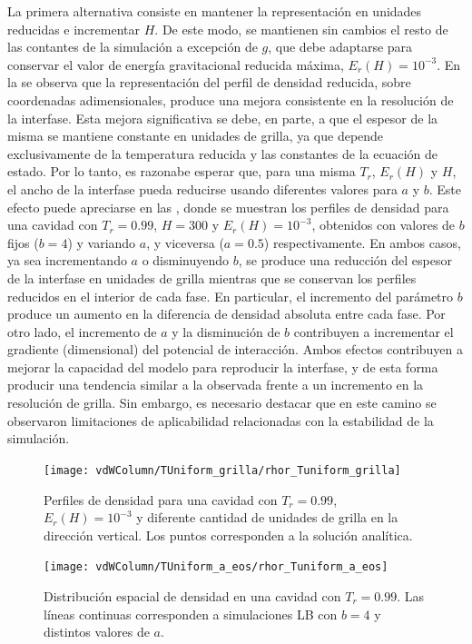 La primera alternativa consiste en mantener la representaci\'on en unidades reducidas e incrementar $H$. De este modo, se mantienen sin cambios el resto de las contantes de la simulaci\'on a excepci\'on de $g$, que debe adaptarse para conservar el valor de energ\'ia gravitacional reducida m\'axima, $E_r(H) = 10^{-3}$. En la  se observa que la representaci\'on del perfil de densidad reducida, sobre coordenadas adimensionales, produce una mejora consistente en la resoluci\'on de la interfase. Esta mejora significativa se debe, en parte, a que el espesor de la misma se mantiene constante en unidades de grilla, ya que depende exclusivamente de la temperatura reducida y las constantes de la ecuaci\'on de estado. Por lo tanto, es razonabe esperar que, para una misma $T_r$, $E_r(H)$ y $H$, el ancho de la interfase pueda reducirse usando diferentes valores para $a$ y $b$. Este efecto puede apreciarse en las , donde se muestran los perfiles de densidad para una cavidad con $T_r=0.99$, $H=300$ y $E_r(H)=10^{-3}$, obtenidos con valores de $b$ fijos ($b=4$) y variando $a$, y viceversa ($a=0.5$) respectivamente. En ambos casos, ya sea incrementando $a$ o disminuyendo $b$, se produce una reducci\'on del espesor de la interfase en unidades de grilla mientras que se conservan los perfiles reducidos en el interior de cada fase. En particular, el incremento del par\'ametro $b$ produce un aumento en la diferencia de densidad absoluta entre cada fase. Por otro lado, el incremento de $a$ y la disminuci\'on de $b$ contribuyen a incrementar el gradiente (dimensional) del potencial de interacci\'on. Ambos efectos contribuyen a mejorar la capacidad del modelo \pp{} para reproducir la interfase, y de esta forma producir una tendencia similar a la observada frente a un incremento en la resoluci\'on de grilla. Sin embargo, es necesario destacar que en este camino se observaron limitaciones de aplicabilidad relacionadas con la estabilidad de la simulaci\'on.

\begin{figure}[ht]
	\centering
	\texttt{[image: vdWColumn/TUniform\_grilla/rhor\_Tuniform\_grilla]}
	\caption{Perfiles de densidad para una cavidad con $T_r = 0.99$, $E_r(H) = 10^{-3}$ y diferente cantidad de unidades de grilla en la direcci\'on vertical. Los puntos corresponden a la soluci\'on anal\'itica.}
	\label{fig:vdWColumn_rhor_grilla}
\end{figure}

\begin{figure}[ht]
	\centering
	\texttt{[image: vdWColumn/TUniform\_a\_eos/rhor\_Tuniform\_a\_eos]}
	\caption{Distribuci\'on espacial de densidad en una cavidad con $T_r = 0.99$. Las l\'ineas continuas corresponden a simulaciones LB con $b=4$ y distintos valores de $a$.}
	\label{fig:vdWColumn_a_eos}
\end{figure}

